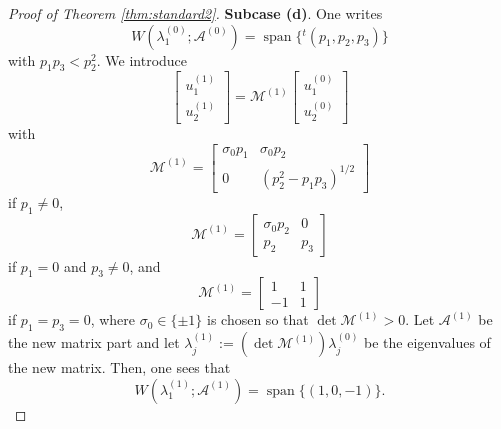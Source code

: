 \documentclass[11pt,a4paper,twosides]{amsart}
\theoremstyle{plain}
\theoremstyle{remark}
\numberwithin{equation}{section}
\DeclareMathOperator{\Span}{span}
\theoremstyle{definition}
\newcommand{\1}{{\bf 1}_{\{|x| < |t|\}}}
\begin{document}
\begin{proof}[Proof of Theorem \ref{thm:standard2}]
{\bf Subcase (d)}. %
One writes
\[
	W(\lambda_1^{(0)};\mathscr{A}^{(0)}) = \Span \{ {}^t\!(p_1,p_2,p_3)\}
\]
with $p_1p_3<p_2^2$.
We introduce
\[
	\begin{bmatrix}
	u_1^{(1)}\\
	u_2^{(1)}
	\end{bmatrix}
	=
	\mathscr{M}^{(1)}
	\begin{bmatrix}
	u_1^{(0)}\\
	u_2^{(0)}
	\end{bmatrix}
\]
with
\[
	\mathscr{M}^{(1)}=\begin{bmatrix}
	\sigma_0 p_1 & \sigma_0 p_2  \\
	0 & (p_2^2-p_1p_3)^{1/2}
	\end{bmatrix}
\]
if $p_1\neq 0$,
\[
	\mathscr{M}^{(1)}=\begin{bmatrix}
	\sigma_0 p_2 & 0 \\
	p_2  & p_3
	\end{bmatrix}
\]
if $p_1=0$ and $p_3\neq 0$, and
\[
	\mathscr{M}^{(1)}=\begin{bmatrix}
	1 & 1 \\
	-1 & 1
	\end{bmatrix}
\]
if $p_1= p_3 = 0$, where $\sigma_0\in \{\pm1\}$ is chosen so that $\det \mathscr{M}^{(1)}>0$.
Let $\mathcal{A}^{(1)}$ be the new matrix part and let $\lambda_j^{(1)}:= (\det \mathscr{M}^{(1)})\lambda_j^{(0)}$ be the eigenvalues of the new matrix.
Then, one sees that
\[
	W(\lambda_1^{(1)};\mathscr{A}^{(1)}) = \Span\{(1,0,-1)\}.
\]


\end{proof}
\end{document}
